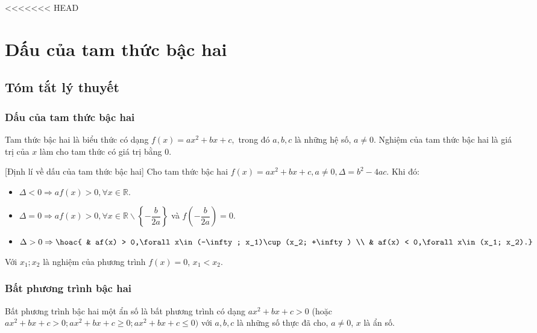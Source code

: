 <<<<<<< HEAD
\setcounter{dang}{0}
\setcounter{section}{2}
\section{Dấu của tam thức bậc hai}
\subsection{Tóm tắt lý thuyết}
	\subsubsection{Dấu của tam thức bậc hai}
	\begin{dn}{}
	Tam thức bậc hai là biểu thức có dạng $f(x) = ax^2 + bx + c,$ trong đó $a,b,c$ là những hệ số, $a\ne 0$. Nghiệm của tam thức bậc hai là giá trị của $x$ làm cho tam thức có giá trị bằng $0$.
	\end{dn}
	\begin{dl}{[Định lí về dấu của tam thức bậc hai]}
	Cho tam thức bậc hai $f(x) = ax^2 + bx + c,a\ne 0,\Delta = b^2 - 4ac$.
	Khi đó:
	\begin{itemize}
	\item $\Delta < 0\Rightarrow af(x) > 0,\forall x\in \mathbb{R}$.
	\item $ \Delta = 0\Rightarrow af(x) > 0,\forall x\in \mathbb{R}\backslash \left\{ - \dfrac{b}{2a}\right\} $ và $f\left(-\dfrac{b}{2a}\right)=0$.
	\item $ \Delta > 0\Rightarrow \hoac{
	& af(x) > 0,\forall x\in (-\infty; x_1)\cup (x_2; +\infty) \\ 
	& af(x) < 0,\forall x\in (x_1; x_2).}$
	\end{itemize}
	Với $x_1;x_2$ là nghiệm của phương trình $f(x) = 0$, $x_1 < x_2$.
	\end{dl}
	\subsubsection{Bất phương trình bậc hai}
	\begin{dn}{}
	Bất phương trình bậc hai một ẩn số là bất phương trình có dạng $ax^2 + bx + c > 0$ (hoặc $ax^2 + bx + c > 0; ax^2 + bx + c\ge 0; ax^2 + bx + c\le 0)$ với $a,b,c$ là những số thực đã cho, $a\ne 0$, $x$ là ẩn số.
	\end{dn}
